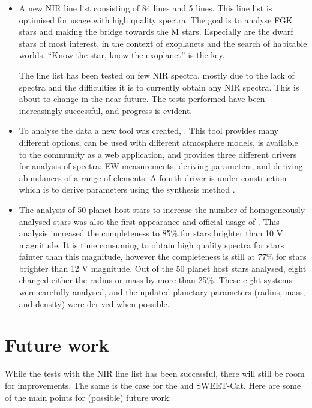 \begin{itemize}
  \item A new NIR line list consisting of 84  lines and 5  lines. This line
        list is optimised for usage with high quality spectra. The goal is to analyse FGK stars and
        making the bridge towards the M stars. Especially are the dwarf stars of most interest, in
        the context of exoplanets and the search of habitable worlds. ``Know the star, know the
        exoplanet'' is the key.

        The line list has been tested on few NIR spectra, mostly due to the lack of spectra and the
        difficulties it is to currently obtain any NIR spectra. This is about to change in the
        near future. The tests performed have been increasingly successful, and progress is evident.
  \item To analyse the data a new tool was created, . This tool provides many different
        options, can be used with different atmosphere models, is available to the community as a
        web application, and provides three different drivers for analysis of spectra: EW
        measurements, deriving parameters, and deriving abundances of a range of elements. A fourth
        driver is under construction which is to derive parameters using the synthesis method
        \citep{Tsantaki2017}.
  \item The analysis of 50 planet-host stars to increase the number of homogeneously analysed stars
        was also the first appearance and official usage of . This analysis increased
        the completeness to 85\% for stars brighter than 10 V magnitude. It is time consuming to
        obtain high quality spectra for stars fainter than this magnitude, however the completeness
        is still at 77\% for stars brighter than 12 V magnitude. Out of the 50 planet host stars
        analysed, eight changed either the radius or mass by more than 25\%. These eight systems
        were carefully analysed, and the updated planetary parameters (radius, mass, and density)
        were derived when possible.
\end{itemize}


\section{Future work}

While the tests with the NIR line list has been successful, there will still be room for
improvements. The same is the case for the  and SWEET-Cat. Here are some of the main
points for (possible) future work.

